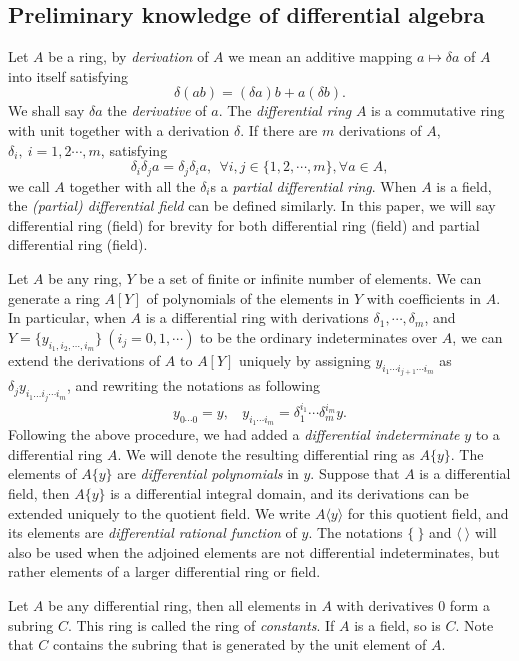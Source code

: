 \documentclass[preprint, 12pt]{elsarticle}
\numberwithin{equation}{section}
\begin{document}
\subsection{Preliminary knowledge of differential algebra}
\label{sec:0.4} 

Let $A$ be a ring, by \textit{derivation} of $A$ we mean an
additive mapping $a\mapsto \delta a$ of $A$ into itself satisfying
$$\delta(a b) =(\delta a) b + a (\delta b).$$
We shall say $\delta a$ the \textit{derivative} of $a$. The
\textit{differential ring} $A$ is a commutative ring with unit
together with a derivation $\delta$. If there are $m$ derivations
of $A$, $\delta_i,\ i = 1,2\cdots, m$, satisfying
$$\delta_i \delta_j a = \delta_j \delta_i a,\ \ \forall i,j\in\{1,2,\cdots,m\}, \forall a\in A,$$
we call $A$ together with all the $\delta_i$s a \textit{partial
differential ring}. When $A$ is a field, the \textit{(partial)
differential field} can be defined similarly. In this paper, we
will say differential ring (field) for brevity for both
differential ring (field) and partial differential ring (field).

Let $A$ be any ring, $Y$ be a set of finite or infinite number of
elements. We can generate a ring $A[Y]$ of polynomials of the elements
in $Y$ with coefficients in $A$. In particular, when $A$ is a
differential ring with derivations $\delta_1,\cdots,\delta_m$, and
$Y = \{y_{i_1,i_2,\cdots,i_m}\}\ (i_j = 0,1,\cdots)$ to be the
ordinary indeterminates over $A$, we can extend the derivations of
$A$ to $A[Y]$ uniquely by assigning $y_{i_1\cdots i_{j+1}\cdots
i_m}$ as $\delta_j y_{i_1\dots i_j\cdots i_m}$, and rewriting the
notations as following
$$y_{0\cdots 0} = y,\ \ \ \  y_{i_1\cdots i_m} = \delta_1^{i_1}\cdots \delta_m^{i_m} y.$$
Following the above procedure, we had added a \textit{differential
indeterminate} $y$ to a differential ring $A$. We will denote the
resulting differential ring as $A\{y\}$. The elements of $A\{y\}$ are
\textit{differential polynomials} in $y$. Suppose that $A$ is a
differential field, then $A\{y\}$ is a differential integral
domain, and its derivations can be extended uniquely to the
quotient field. We write $A\langle y\rangle $ for this quotient
field, and its elements are \textit{differential rational
function} of $y$. The notations $\{\ \}$ and $\langle \ \rangle $
will also be used when the adjoined elements are not differential
indeterminates, but rather elements of a larger differential ring
or field.

Let $A$ be any differential ring, then all elements in $A$ with
derivatives $0$ form a subring $C$. This ring is called the ring
of \textit{constants}. If $A$ is a field, so is $C$. Note that $C$
contains the subring that is generated by the unit element of $A$.
\end{document}
